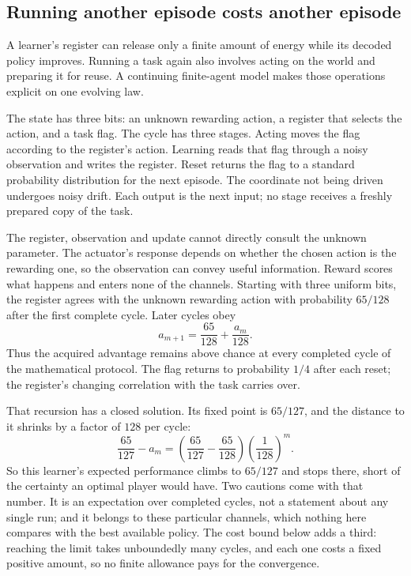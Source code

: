 \documentclass[11pt]{article}
\begin{document}
\subsection{Running another episode costs another episode}
\label{sec:continuing-agent}

A learner's register can release only a finite amount of energy while its
decoded policy improves. Running a task again also involves acting on the
world and preparing it for reuse. A continuing finite-agent model makes those
operations explicit on one evolving law.

The state has three bits: an unknown rewarding action, a register that
selects the action, and a task flag. The cycle has three stages. Acting moves
the flag according to the register's action. Learning reads that flag through
a noisy observation and writes the register. Reset returns the flag to a
standard probability distribution for the next episode. The coordinate not
being driven undergoes noisy drift. Each output is the next input; no stage
receives a freshly prepared copy of the task.

The register, observation and update cannot directly consult the unknown
parameter. The actuator's response depends on whether the chosen action is
the rewarding one, so the observation can convey useful information. Reward
scores what happens and enters none of the channels. Starting with three
uniform bits, the register agrees with the unknown rewarding action with
probability $65/128$ after the first complete cycle. Later cycles obey
\[
 a_{m+1}=\frac{65}{128}+\frac{a_m}{128}.
\]
Thus the acquired advantage remains above chance at every completed cycle
of the mathematical protocol. The flag returns to probability $1/4$ after
each reset; the register's changing correlation with the task carries over.

That recursion has a closed solution. Its fixed point is $65/127$, and the
distance to it shrinks by a factor of $128$ per cycle:
\[
 \frac{65}{127}-a_m=\left(\frac{65}{127}-\frac{65}{128}\right)
   \left(\frac{1}{128}\right)^{m}.
\]
So this learner's expected performance climbs to $65/127$ and stops there,
short of the certainty an optimal player would have. Two cautions come with
that number. It is an expectation over completed cycles, not a statement
about any single run; and it belongs to these particular channels, which
nothing here compares with the best available policy. The cost bound below
adds a third: reaching the limit takes unboundedly many cycles, and each
one costs a fixed positive amount, so no finite allowance pays for the
convergence.
\end{document}

